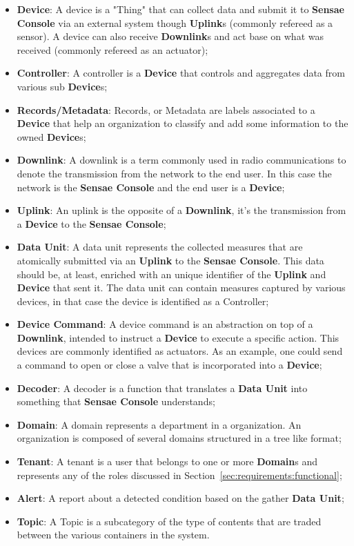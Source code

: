 \begin{itemize}
   \item \textbf{Device}: A device is a "Thing" that can collect data and submit it to \textbf{Sensae Console} via an external system though \textbf{Uplink}s (commonly refereed as a sensor). A device can also receive \textbf{Downlink}s and act base on what was received (commonly refereed as an actuator);
   \item \textbf{Controller}: A controller is a \textbf{Device} that controls and aggregates data from various sub \textbf{Device}s;
   \item \textbf{Records/Metadata}: Records, or Metadata are labels associated to a \textbf{Device} that help an organization to classify and add some information to the owned \textbf{Device}s;
   \item \textbf{Downlink}: A downlink is a term commonly used in radio communications to denote the transmission from the network to the end user. In this case the network is the \textbf{Sensae Console} and the end user is a \textbf{Device};
   \item \textbf{Uplink}: An uplink is the opposite of a \textbf{Downlink}, it's the transmission from a \textbf{Device} to the \textbf{Sensae Console};
   \item \textbf{Data Unit}: A data unit represents the collected measures that are atomically submitted via an \textbf{Uplink} to the \textbf{Sensae Console}. This data should be, at least, enriched with an unique identifier of the \textbf{Uplink} and \textbf{Device} that sent it. The data unit can contain measures captured by various devices, in that case the device is identified as a Controller;
   \item \textbf{Device Command}: A device command is an abstraction on top of a \textbf{Downlink}, intended to instruct a \textbf{Device} to execute a specific action. This devices are commonly identified as actuators. As an example, one could send a command to open or close a valve that is incorporated into a \textbf{Device};
   \item \textbf{Decoder}: A decoder is a function that translates a \textbf{Data Unit} into something that \textbf{Sensae Console} understands;
   \item \textbf{Domain}: A domain represents a department in a organization. An organization is composed of several domains structured in a tree like format;
   \item \textbf{Tenant}: A tenant is a user that belongs to one or more \textbf{Domain}s and represents any of the roles discussed in Section~\ref{sec:requirements:functional};
   \item \textbf{Alert}: A report about a detected condition based on the gather \textbf{Data Unit};
   \item \textbf{Topic}: A Topic is a subcategory of the type of contents that are traded between the various containers in the system.
\end{itemize}

